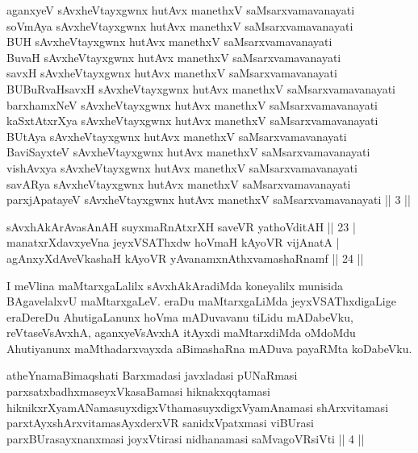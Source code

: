 \begin{kandikeshl}
aganxyeV sAvxheVtayxgwnx hutAvx manethxV saMsarxvamavanayati \\
soVmAya sAvxheVtayxgwnx hutAvx manethxV saMsarxvamavanayati \\
BUH sAvxheVtayxgwnx hutAvx manethxV saMsarxvamavanayati\\
BuvaH sAvxheVtayxgwnx hutAvx manethxV saMsarxvamavanayati \\
savxH sAvxheVtayxgwnx hutAvx manethxV saMsarxvamavanayati \\
BUBuRvaHsavxH sAvxheVtayxgwnx hutAvx manethxV saMsarxvamavanayati \\
barxhamxNeV sAvxheVtayxgwnx hutAvx manethxV saMsarxvamavanayati \\
kaSxtAtxrXya sAvxheVtayxgwnx hutAvx manethxV saMsarxvamavanayati \\
BUtAya sAvxheVtayxgwnx hutAvx manethxV saMsarxvamavanayati \\
BaviSayxteV sAvxheVtayxgwnx hutAvx manethxV saMsarxvamavanayati \\
vishAvxya sAvxheVtayxgwnx hutAvx manethxV saMsarxvamavanayati \\
savARya sAvxheVtayxgwnx hutAvx manethxV saMsarxvamavanayati \\
parxjApatayeV sAvxheVtayxgwnx hutAvx manethxV saMsarxvamavanayati || 3 ||
\end{kandikeshl}


\begin{shl}
sAvxhAkArAvasAnAH suyxmaRnAtxrXH saveVR yathoVditAH \hfill|| 23 | \\
manatxrXdavxyeVna jeyxVSAThxdw hoVmaH kAyoVR vijAnatA | \\
agAnxyXdAveVkashaH kAyoVR yAvanamxnAthxvamashaRnamf \hfill|| 24 || 
\end{shl}

\begin{artha}
I meVlina maMtarxgaLalilx sAvxhAkAradiMda koneyalilx munisida BAgavelalxvU maMtarxgaLeV. eraDu maMtarxgaLiMda jeyxVSAThxdigaLige eraDereDu AhutigaLanunx hoVma mADuvavanu tiLidu mADabeVku, reVtaseVsAvxhA, aganxyeVsAvxhA itAyxdi maMtarxdiMda oMdoMdu Ahutiyanunx maMthadarxvayxda aBimashaRna mADuva payaRMta koDabeVku.
\end{artha}

\begin{kandikeshl}
atheYnamaBimaqshati Barxmadasi javxladasi pUNaRmasi parxsatxbadhxmaseyxVkasaBamasi hiknakxqqtamasi hiknikxrXyamANamasuyxdigxVthamasuyxdigxVyamAnamasi shArxvitamasi parxtAyxshArxvitamasAyxderxVR sanidxVpatxmasi viBUrasi parxBUrasayxnanxmasi joyxVtirasi nidhanamasi saMvagoVR\s siVti || 4 ||
\end{kandikeshl}

